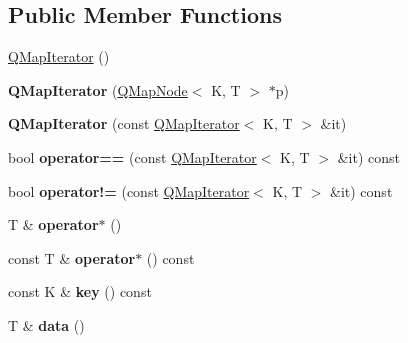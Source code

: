 \subsection*{Public Member Functions}
\begin{DoxyCompactItemize}
\item 
\mbox{\hyperlink{class_q_map_iterator_aca07d44f63b18f752c502c77f5d6f502}{Q\+Map\+Iterator}} ()
\item 
\mbox{\label{class_q_map_iterator_aa32eaacfcdc51d680897d340766a4ee7}} 
{\bfseries Q\+Map\+Iterator} (\mbox{\hyperlink{struct_q_map_node}{Q\+Map\+Node}}$<$ K, T $>$ $\ast$p)
\item 
\mbox{\label{class_q_map_iterator_aa71f55ddf81484e17429e6243c6f4313}} 
{\bfseries Q\+Map\+Iterator} (const \mbox{\hyperlink{class_q_map_iterator}{Q\+Map\+Iterator}}$<$ K, T $>$ \&it)
\item 
\mbox{\label{class_q_map_iterator_aa225e03bdbc82920f005e93f342c00d7}} 
bool {\bfseries operator==} (const \mbox{\hyperlink{class_q_map_iterator}{Q\+Map\+Iterator}}$<$ K, T $>$ \&it) const
\item 
\mbox{\label{class_q_map_iterator_a917a6e01bc96900a1b2291b2b989c5d4}} 
bool {\bfseries operator!=} (const \mbox{\hyperlink{class_q_map_iterator}{Q\+Map\+Iterator}}$<$ K, T $>$ \&it) const
\item 
\mbox{\label{class_q_map_iterator_a3f0b1409ac53c00c0c86bbf10ec975dc}} 
T \& {\bfseries operator$\ast$} ()
\item 
\mbox{\label{class_q_map_iterator_a624023e4fd8096a16c1e7ddd83c9b6da}} 
const T \& {\bfseries operator$\ast$} () const
\item 
\mbox{\label{class_q_map_iterator_a96ef3fec26d97ce3096ea118cfbbac68}} 
const K \& {\bfseries key} () const
\item 
\mbox{\label{class_q_map_iterator_a930235c1c9958fa33af55182231c01f9}} 
T \& {\bfseries data} ()
\item 
\mbox{\label{class_q_map_iterator_a9b4778927cfd3da06d603c1230be3ac0}} 

\end{DoxyCompactItemize}
